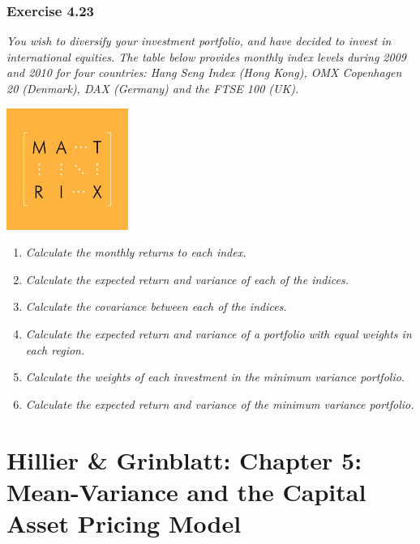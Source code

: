 \documentclass[]{book}
\theoremstyle{definition}
\theoremstyle{definition}
\theoremstyle{remark}
\begin{document}
\subsection{Exercise 4.23}\label{exercise-4.23}

\emph{You wish to diversify your investment portfolio, and have decided
to invest in international equities. The table below provides monthly
index levels during 2009 and 2010 for four countries: Hang Seng Index
(Hong Kong), OMX Copenhagen 20 (Denmark), DAX (Germany) and the FTSE 100
(UK).} \citep[p.119]{book}

\begin{center}\includegraphics[width=150px]{figures/matrix} \end{center}

\begin{enumerate}
\def\labelenumi{\alph{enumi}.}
\item
  \emph{Calculate the monthly returns to each index.}
  \citep[p.120]{book}
\item
  \emph{Calculate the expected return and variance of each of the
  indices.} \citep[p.120]{book}
\item
  \emph{Calculate the covariance between each of the indices.}
  \citep[p.120]{book}
\item
  \emph{Calculate the expected return and variance of a portfolio with
  equal weights in each region.} \citep[p.120]{book}
\item
  \emph{Calculate the weights of each investment in the minimum variance
  portfolio.} \citep[p.120]{book}
\item
  \emph{Calculate the expected return and variance of the minimum
  variance portfolio.} \citep[p.120]{book}
\end{enumerate}

\chapter{Hillier \& Grinblatt: Chapter 5: Mean-Variance and the Capital
Asset Pricing
Model}\label{hillier-grinblatt-chapter-5-mean-variance-and-the-capital-asset-pricing-model}
\end{document}
